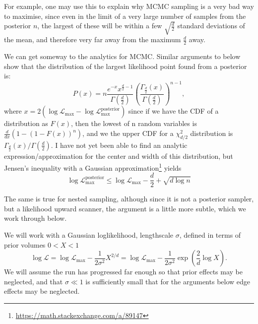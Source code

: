 \documentclass[usenatbib]{mnras} %
\begin{document}
For example, one may use this to explain why MCMC sampling is a very bad way to maximise, since even in the limit of a very large number of samples from the posterior $n$, the largest of these will be within a few $\sqrt{\frac{d}{2}}$ standard deviations of the mean, and therefore very far away from the maximum $\frac{d}{2}$ away.

We can get someway to the analytics for MCMC. Similar arguments to below show that the distribution of the largest likelihood point found from a posterior is:
\begin{equation}
    P(x) = n \frac{e^{-x} x^{\frac{d}{2}-1} }{\Gamma\left(\frac{d}{2}\right)} {\left( \frac{\Gamma_{\frac{d}{2}}(x)}{\Gamma(\frac{d}{2})} \right)}^{n-1},
\end{equation}
where $x=2(\log\mathcal{L}_\mathrm{max}-\log\mathcal{L}_\mathrm{max}^\mathrm{posterior})$
since if we have the CDF of a distribution as $F(x)$, then the lowest of n random variables is $\frac{d}{dx}( 1- (1-F(x))^n)$, and we the upper CDF for a $\chi^2_{d/2}$ distribution is $\Gamma_{\frac{d}{2}}(x)/\Gamma(\frac{d}{2})$. I have not yet been able to find an analytic expression/approximation for the center and width of this distribution, but Jensen's inequality with a Gaussian approximation\footnote{\url{https://math.stackexchange.com/a/89147}} yields
\begin{equation}
    \log\mathcal{L}_\mathrm{max}^\mathrm{posterior} \le  \log\mathcal{L}_\mathrm{max} - \frac{d}{2} + \sqrt{d\log n} 
\end{equation}

The same is true for nested sampling, although since it is not a posterior sampler, but a likelihood upward scanner, the argument is a little more subtle, which we work through below.

We will work with a Gaussian loglikelihood, lengthscale $\sigma$, defined in terms of prior volumes $0<X<1$
\begin{equation}
    \log\mathcal{L}
    =\log\mathcal{L}_\mathrm{max} - \frac{1}{2\sigma^2}X^{2/d}
    =\log\mathcal{L}_\mathrm{max} - \frac{1}{2\sigma^2}\exp\left(\frac{2}{d}\log X\right).
    \label{eq:LX}
\end{equation}
We will assume the run has progressed far enough so that prior effects may be neglected, and that $\sigma\ll 1$ is sufficiently small that for the arguments below edge effects may be neglected.
\end{document}
